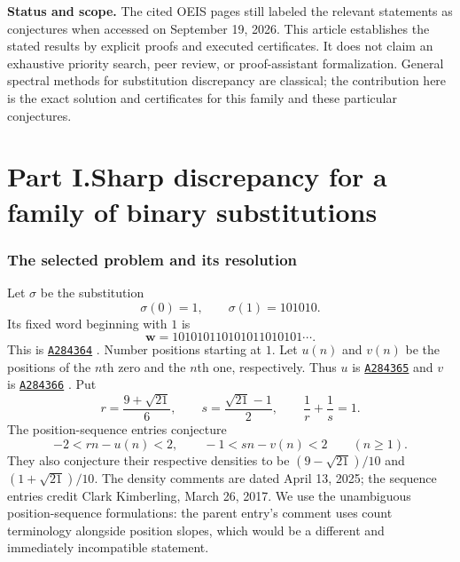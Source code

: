 \documentclass[11pt]{article}
\numberwithin{equation}{section}
\theoremstyle{definition}
\theoremstyle{remark}
\newcommand{\word}{\mathbf{w}}
\newcommand{\OEIS}[1]{\href{https://oeis.org/#1}{\texttt{#1}}}
\begin{document}
\begin{resultbox}
\textbf{Status and scope.} The cited OEIS pages still labeled the relevant
statements as conjectures when accessed on September 19, 2026.
This article establishes the stated results by explicit proofs and executed
certificates. It does not claim an exhaustive priority search, peer review,
or proof-assistant formalization. General spectral methods for substitution
discrepancy are classical; the contribution here is the exact solution and
certificates for this family and these particular conjectures.
\end{resultbox}

\clearpage
\tableofcontents
\clearpage

\part*{Part I.\quad Sharp discrepancy for a family of binary substitutions}
\section{The selected problem and its resolution}\label{sec:problem}

Let $\sigma$ be the substitution
\begin{equation}\label{eq:original-sub}
\sigma(0)=1,\qquad \sigma(1)=101010.
\end{equation}
Its fixed word beginning with $1$ is
\[
\word=101010110101011010101\cdots.
\]
This is \OEIS{A284364} \cite{oeis364}. Number positions starting at $1$.
Let $u(n)$ and $v(n)$ be the positions of the $n$th zero and the $n$th one,
respectively. Thus $u$ is \OEIS{A284365} and $v$ is \OEIS{A284366}
\cite{oeis365,oeis366}. Put
\begin{equation}\label{eq:rs3}
r=\frac{9+\sqrt{21}}6,\qquad
s=\frac{\sqrt{21}-1}2,\qquad \frac1r+\frac1s=1.
\end{equation}
The position-sequence entries conjecture
\begin{equation}\label{eq:conjectures}
-2<rn-u(n)<2,\qquad -1<sn-v(n)<2\qquad(n\ge1).
\end{equation}
They also conjecture their respective densities to be
$(9-\sqrt{21})/10$ and $(1+\sqrt{21})/10$. The density comments are dated
April 13, 2025; the sequence entries credit Clark Kimberling, March 26,
2017. We use the unambiguous position-sequence formulations: the parent
entry's comment uses count terminology alongside position slopes, which
would be a different and immediately incompatible statement.
\end{document}
